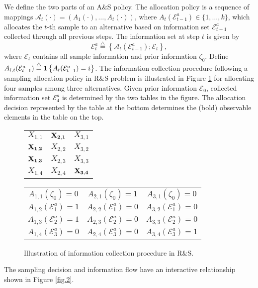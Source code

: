 \documentclass[journal]{IEEEtran}
\newcommand{\ed}{\stackrel{\triangle}{=}}
\begin{document}
  We define the two parts of an A\&S policy. The allocation policy is a sequence of mappings $\mathcal{A}_t(\cdot)=(A_1(\cdot),\ldots,A_t(\cdot))$, where 
  $A_{t}(\mathcal{E}_{t-1}^a)\in \{1,\ldots,k\}$, which allocates the $t$-th sample to  an alternative based on information set $\mathcal{E}_{t-1}^a$ collected through all previous steps. The information set at step $t$ is given by  
  $$\mathcal{E}_t^a\ed\left\{\mathcal{A}_t(\mathcal{E}_{t-1}^a); \mathcal{E}_t\right\},$$
  where  $\mathcal{E}_t$ contains all sample information and prior information $\zeta_0$. 
 Define $A_{i,t}(\mathcal{E}_{t-1}^a)\ed{\bf1}\left\{A_{t}(\mathcal{E}_{t-1}^a)=i\right\}$.  
 The information collection procedure following a sampling allocation policy in R\&S problem is illustrated in Figure \ref{fig.1} for allocating four samples among three alternatives. Given prior information $\mathcal{E}_0$, collected information set $\mathcal{E}_4^a$ is determined by the two tables in the figure. The allocation decision represented by the table at the bottom determines the (bold) observable elements  in the table on the top. 
   \begin{figure}[tb]
    \centering
   \begin{tabular}{c c c }
   $X_{1,1}$  &${\bf X_{2,1}}$ &$X_{3,1}$\\
   ${\bf X_{1,2}}$  & $X_{2,2}$&$X_{3,2}$\\
   ${\bf X_{1,3}}$  & $X_{2,3}$&$X_{3,3}$\\
   $X_{1,4}$  & $X_{2,4}$&${\bf X_{3,4}}$
   \end{tabular}\vspace*{3mm}
      \begin{tabular}{c c c }
      $A_{1,1}(\zeta_0)=0$  &$A_{2,1}(\zeta_0)=1$ &$A_{3,1}(\zeta_0)=0$\\
      $A_{1,2}(\mathcal{E}_1^a)=1$  & $A_{2,2}(\mathcal{E}_1^a)=0$&$A_{3,2}(\mathcal{E}_1^a)=0$\\
      $A_{1,3}(\mathcal{E}_2^a)=1$  & $A_{2,3}(\mathcal{E}_2^a)=0$&$A_{3,3}(\mathcal{E}_2^a)=0$\\
      $A_{1,4}(\mathcal{E}_3^a)=0$  & $A_{2,4}(\mathcal{E}_3^a)=0$&$A_{3,4}(\mathcal{E}_3^a)=1$
      \end{tabular}
   \vspace*{0.1in}
   \caption{ Illustration of information collection procedure in R\&S. 
   }
   \label{fig.1}\normalsize
   \end{figure}
   The sampling decision and information flow have an interactive relationship shown in Figure \ref{fig.2}. 
\end{document}
